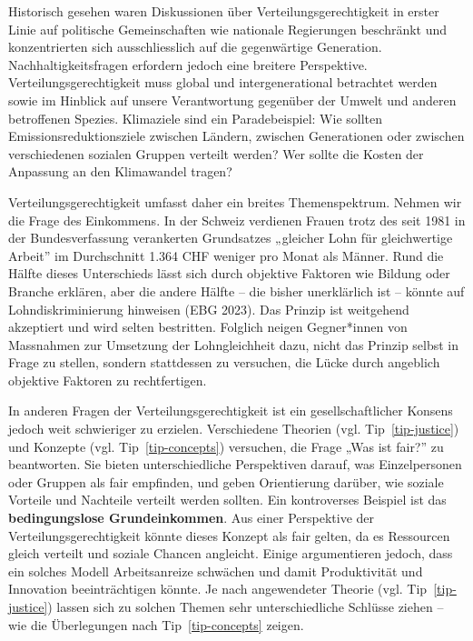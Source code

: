 \documentclass[
  nswissgerman,
  a4paper,
  openany]{book}
\begin{document}
Historisch gesehen waren Diskussionen über Verteilungsgerechtigkeit in
erster Linie auf politische Gemeinschaften wie nationale Regierungen
beschränkt und konzentrierten sich ausschliesslich auf die gegenwärtige
Generation. Nachhaltigkeitsfragen erfordern jedoch eine breitere
Perspektive. Verteilungsgerechtigkeit muss global und intergenerational
betrachtet werden sowie im Hinblick auf unsere Verantwortung gegenüber
der Umwelt und anderen betroffenen Spezies. Klimaziele sind ein
Paradebeispiel: Wie sollten Emissionsreduktionsziele zwischen Ländern,
zwischen Generationen oder zwischen verschiedenen sozialen Gruppen
verteilt werden? Wer sollte die Kosten der Anpassung an den Klimawandel
tragen?

Verteilungsgerechtigkeit umfasst daher ein breites Themenspektrum.
Nehmen wir die Frage des Einkommens. In der Schweiz verdienen Frauen
trotz des seit 1981 in der Bundesverfassung verankerten Grundsatzes
„gleicher Lohn für gleichwertige Arbeit'' im Durchschnitt 1.364 CHF
weniger pro Monat als Männer. Rund die Hälfte dieses Unterschieds lässt
sich durch objektive Faktoren wie Bildung oder Branche erklären, aber
die andere Hälfte -- die bisher unerklärlich ist -- könnte auf
Lohndiskriminierung hinweisen (EBG 2023). Das Prinzip ist weitgehend
akzeptiert und wird selten bestritten. Folglich neigen Gegner*innen von
Massnahmen zur Umsetzung der Lohngleichheit dazu, nicht das Prinzip
selbst in Frage zu stellen, sondern stattdessen zu versuchen, die Lücke
durch angeblich objektive Faktoren zu rechtfertigen.

In anderen Fragen der Verteilungsgerechtigkeit ist ein
gesellschaftlicher Konsens jedoch weit schwieriger zu erzielen.
Verschiedene Theorien (vgl. Tip~\ref{tip-justice}) und Konzepte (vgl.
Tip~\ref{tip-concepts}) versuchen, die Frage „Was ist fair?'' zu
beantworten. Sie bieten unterschiedliche Perspektiven darauf, was
Einzelpersonen oder Gruppen als fair empfinden, und geben Orientierung
darüber, wie soziale Vorteile und Nachteile verteilt werden sollten. Ein
kontroverses Beispiel ist das \textbf{bedingungslose Grundeinkommen}.
Aus einer Perspektive der Verteilungsgerechtigkeit könnte dieses Konzept
als fair gelten, da es Ressourcen gleich verteilt und soziale Chancen
angleicht. Einige argumentieren jedoch, dass ein solches Modell
Arbeitsanreize schwächen und damit Produktivität und Innovation
beeinträchtigen könnte. Je nach angewendeter Theorie (vgl.
Tip~\ref{tip-justice}) lassen sich zu solchen Themen sehr
unterschiedliche Schlüsse ziehen -- wie die Überlegungen nach
Tip~\ref{tip-concepts} zeigen.
\end{document}

